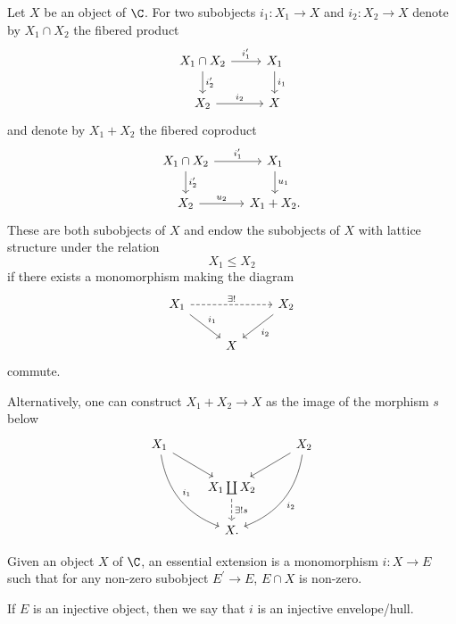 \begin{defn}
  Let $X$ be an object of $\C$.
  For two subobjects $i_1 \colon X_1 \rightarrow X$ and $i_2 \colon X_2 \rightarrow X$ denote by $X_1 \cap X_2$ the fibered product
  $$\begin{tikzcd}
    X_1 \cap X_2 \arrow{d}{i_2^\prime}\arrow{r}{i_1^\prime} & X_1\arrow{d}{i_1}\\
    X_2 \arrow{r}{i_2} & X
  \end{tikzcd}$$
  and denote by $X_1 + X_2$ the fibered coproduct 
  $$\begin{tikzcd}
    X_1 \cap X_2 \arrow{r}{i_1^\prime} \arrow{d}{i_2^\prime} & X_1\arrow{d}{u_1}\\
    X_2 \arrow{r}{u_2} & X_1 + X_2.
  \end{tikzcd}$$
  These are both subobjects of $X$ and endow the subobjects of $X$ with lattice structure under the relation
  $$X_1 \leq X_2$$
  if there exists a monomorphism making the diagram
  $$\begin{tikzcd}
    X_1\arrow{rd}{i_1}\arrow[dashed]{rr}{\exists !} & & X_2 \arrow{ld}{i_2}\\
    & X &
  \end{tikzcd}$$
  commute.
\end{defn}

\begin{rmk}
  Alternatively, one can construct $X_1 + X_2 \rightarrow X$ as the image of the morphism $s$ below
  $$\begin{tikzcd}
    X_1\arrow[bend right]{rdd}{i_1}\arrow{rd} & & X_2 \arrow{ld} \arrow[bend left]{ldd}{i_2}\\
    & X_1 \coprod X_2\arrow[dashed]{d}{\exists !s} &\\
    & X. &
  \end{tikzcd}$$
\end{rmk}

\begin{defn}
  Given an object $X$ of $\C$, an essential extension is a monomorphism $i \colon X \rightarrow E$ such that for any non-zero subobject $E^\prime \rightarrow E$, $E \cap X$ is non-zero.
  
  If $E$ is an injective object, then we say that $i$ is an injective envelope/hull.
\end{defn}

